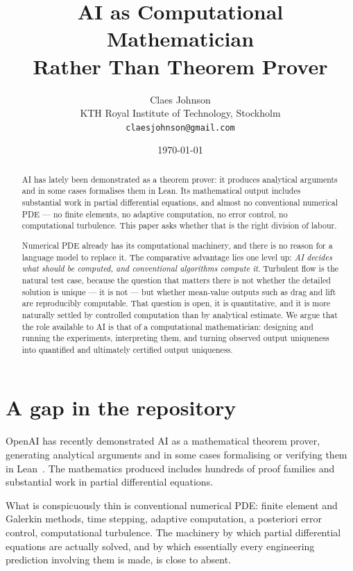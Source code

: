 \documentclass[11pt]{article}
\title{\vspace{-2em}AI as Computational Mathematician\\Rather Than Theorem Prover}
\author{Claes Johnson\\[0.3em]
\small KTH Royal Institute of Technology, Stockholm\\
\small \texttt{claesjohnson@gmail.com}}
\date{\today}
\begin{document}
\maketitle

\begin{abstract}
\noindent
AI has lately been demonstrated as a theorem prover: it produces analytical arguments and in some
cases formalises them in Lean. Its mathematical output includes substantial work in partial
differential equations, and almost no conventional numerical PDE --- no finite elements, no adaptive
computation, no error control, no computational turbulence. This paper asks whether that is the right
division of labour.

Numerical PDE already has its computational machinery, and there is no reason for a language model to
replace it. The comparative advantage lies one level up: \emph{AI decides what should be computed,
and conventional algorithms compute it}. Turbulent flow is the natural test case, because the
question that matters there is not whether the detailed solution is unique --- it is not --- but
whether mean-value outputs such as drag and lift are reproducibly computable. That question is open,
it is quantitative, and it is more naturally settled by controlled computation than by analytical
estimate. We argue that the role available to AI is that of a computational mathematician: designing
and running the experiments, interpreting them, and turning observed output uniqueness into
quantified and ultimately certified output uniqueness.
\end{abstract}

\section{A gap in the repository}\label{sec:gap}

OpenAI has recently demonstrated AI as a mathematical theorem prover, generating analytical arguments
and in some cases formalising or verifying them in Lean~\cite{openaiNS,openaiEuler}. The
mathematics produced includes hundreds of proof families and substantial work in partial differential
equations.

What is conspicuously thin is conventional numerical PDE: finite element and Galerkin methods, time
stepping, adaptive computation, a posteriori error control, computational turbulence. The machinery
by which partial differential equations are actually solved, and by which essentially every
engineering prediction involving them is made, is close to absent.
\end{document}
